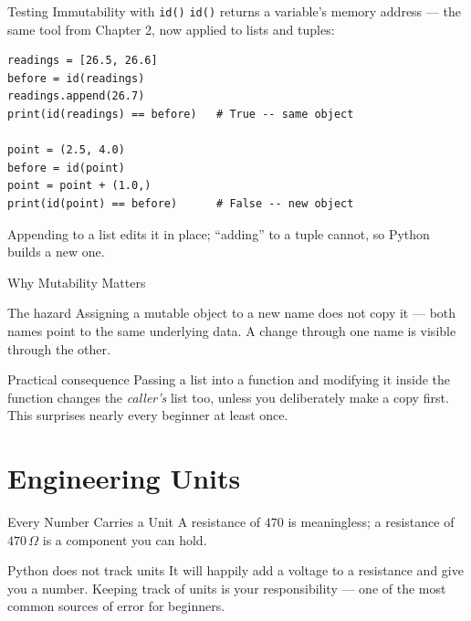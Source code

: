 \documentclass[9pt,aspectratio=169,xcolor=table]{beamer}
\begin{document}
\begin{frame}[fragile]{Testing Immutability with \texttt{id()}}
    \leavevmode
    \texttt{id()} returns a variable's memory address --- the same tool
    from Chapter 2, now applied to lists and tuples:

\begin{lstlisting}
readings = [26.5, 26.6]
before = id(readings)
readings.append(26.7)
print(id(readings) == before)   # True -- same object

point = (2.5, 4.0)
before = id(point)
point = point + (1.0,)
print(id(point) == before)      # False -- new object
\end{lstlisting}

    \vspace{1mm}
    {\small Appending to a list edits it in place; ``adding'' to a tuple
    cannot, so Python builds a new one.}
\end{frame}

\begin{frame}{Why Mutability Matters}
    \leavevmode
    \begin{alertblock}{The hazard}
        Assigning a mutable object to a new name does \alert{not} copy
        it --- both names point to the same underlying data. A change
        through one name is visible through the other.
    \end{alertblock}

    \vspace{3mm}
    \begin{block}{Practical consequence}
        \small Passing a list into a function and modifying it inside
        the function changes the \emph{caller's} list too, unless you
        deliberately make a copy first. This surprises nearly every
        beginner at least once.
    \end{block}
\end{frame}

\section{Engineering Units}

\begin{frame}{Every Number Carries a Unit}
    \leavevmode
    A resistance of $470$ is meaningless; a resistance of $470\,\Omega$
    is a component you can hold.

    \vspace{3mm}
    \begin{alertblock}{Python does not track units}
        It will happily add a voltage to a resistance and give you a
        number. Keeping track of units is \alert{your} responsibility
        --- one of the most common sources of error for beginners.
    \end{alertblock}
\end{frame}
\end{document}
